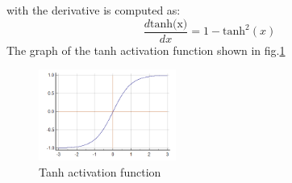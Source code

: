 \begin{itemize}
    with the derivative is computed as:
    \begin{equation}
        \frac{d\text{tanh(x)}}{dx} = 1-\text{tanh}^2(x)
    \end{equation}
    The graph of the tanh activation function shown in fig.\ref{fig:tanh}
    \begin{figure}[h!]
        \centering
        \includegraphics[width=0.4\textwidth]{Chapters/Fig/tanh.png}
        \caption{Tanh activation function}
        \label{fig:tanh}
    \end{figure}


\end{itemize}
